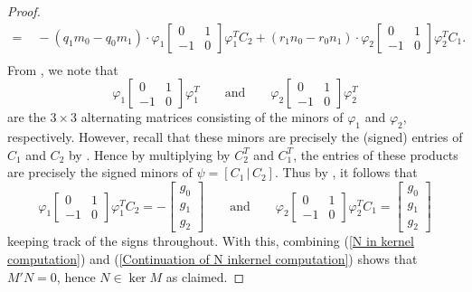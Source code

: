 \documentclass[reqno]{amsart}
\numberwithin{equation}{section}
\theoremstyle{definition}
\begin{document}
\begin{proof}
\begin{equation}
\begin{aligned}
 =&\,\, -(q_1m_0 - q_0m_1) \cdot \varphi_1\begin{bmatrix}
     0&1\\
     -1&0
 \end{bmatrix}\varphi_1^TC_2 + (r_1n_0 - r_0n_1)\cdot \varphi_2\begin{bmatrix}
     0&1\\
     -1&0
 \end{bmatrix}\varphi_2^TC_1. \\[1ex]
\end{aligned}
\end{equation}
From , we note that 
\[
\varphi_1\begin{bmatrix}
     0&1\\
     -1&0
 \end{bmatrix}\varphi_1^T
 \quad\quad\text{and}\quad\quad
 \varphi_2\begin{bmatrix}
     0&1\\
     -1&0
 \end{bmatrix}\varphi_2^T
\]
are the $3\times 3$ alternating matrices consisting of the minors of $\varphi_1$ and $\varphi_2$, respectively. However, recall that these minors are precisely the (signed) entries of $C_1$ and $C_2$ by . Hence by multiplying by $C_2^T$ and $C_1^T$, the entries of these products are precisely the signed minors of $\psi = [C_1\,|\,C_2]$. Thus by , it follows that 
\begin{equation}\label{Continuation of N inkernel computation}
\varphi_1\begin{bmatrix}
     0&1\\
     -1&0
 \end{bmatrix}\varphi_1^TC_2 = -\begin{bmatrix}
     g_0\\
      g_1\\
      g_2
  \end{bmatrix}
 \quad\quad\text{and}\quad\quad
 \varphi_2\begin{bmatrix}
     0&1\\
     -1&0
 \end{bmatrix}\varphi_2^TC_1 = \begin{bmatrix}
    g_0\\
      g_1\\
      g_2
  \end{bmatrix}
\end{equation}
keeping track of the signs throughout. With this, combining (\ref{N in kernel computation}) and (\ref{Continuation of N inkernel computation}) shows that $M'N=0$, hence $N\in \ker M$ as claimed.


\end{proof}
\end{document}
